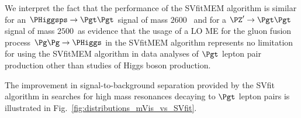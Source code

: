 We interpret the fact that the performance of the SVfitMEM algorithm is similar for an $\PHiggsps \to \Pgt\Pgt$ signal of mass $2600$~\GeV
and for a $\PZ' \to \Pgt\Pgt$ signal of mass $2500$~\GeV as evidence that the usage of a
LO ME for the gluon fusion process $\Pg\Pg \to \PHiggs$ in the SVfitMEM algorithm represents no limitation for using
the SVfitMEM algorithm in data analyses of $\Pgt$ lepton pair production other than studies of Higgs boson production.

The improvement in signal-to-background separation provided by the
SVfit algorithm in searches for high mass resonances decaying to $\Pgt$ lepton pairs is illustrated in Fig.~\ref{fig:distributions_mVis_vs_SVfit}.

\begin{figure}
\setlength{\unitlength}{1mm}
\begin{center}
\end{center}
\end{figure}
